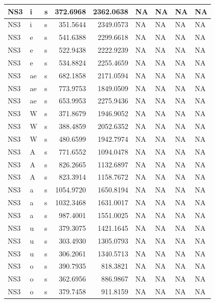 \documentclass[man, fleqn, noextraspace]{apa6}
\begin{document}
\begin{tabular}{l|l|l|r|r|l|l|l|l}
\hline
NS3 & i & s & 372.6968 & 2362.0638 & NA & NA & NA & NA\\
\hline
NS3 & i & s & 351.5644 & 2349.0573 & NA & NA & NA & NA\\
\hline
NS3 & e & s & 541.6388 & 2299.6618 & NA & NA & NA & NA\\
\hline
NS3 & e & s & 522.9438 & 2222.9239 & NA & NA & NA & NA\\
\hline
NS3 & e & s & 534.8824 & 2255.4659 & NA & NA & NA & NA\\
\hline
NS3 & ae & s & 682.1858 & 2171.0594 & NA & NA & NA & NA\\
\hline
NS3 & ae & s & 773.9753 & 1849.0509 & NA & NA & NA & NA\\
\hline
NS3 & ae & s & 653.9953 & 2275.9436 & NA & NA & NA & NA\\
\hline
NS3 & W & s & 371.8679 & 1946.9052 & NA & NA & NA & NA\\
\hline
NS3 & W & s & 388.4859 & 2052.6352 & NA & NA & NA & NA\\
\hline
NS3 & W & s & 480.6599 & 1942.7974 & NA & NA & NA & NA\\
\hline
NS3 & A & s & 771.6552 & 1094.0478 & NA & NA & NA & NA\\
\hline
NS3 & A & s & 826.2665 & 1132.6897 & NA & NA & NA & NA\\
\hline
NS3 & A & s & 823.3914 & 1158.7672 & NA & NA & NA & NA\\
\hline
NS3 & a & s & 1054.9720 & 1650.8194 & NA & NA & NA & NA\\
\hline
NS3 & a & s & 1032.3468 & 1631.0017 & NA & NA & NA & NA\\
\hline
NS3 & a & s & 987.4001 & 1551.0025 & NA & NA & NA & NA\\
\hline
NS3 & u & s & 379.3075 & 1421.1645 & NA & NA & NA & NA\\
\hline
NS3 & u & s & 303.4930 & 1305.0793 & NA & NA & NA & NA\\
\hline
NS3 & u & s & 306.2061 & 1340.5713 & NA & NA & NA & NA\\
\hline
NS3 & o & s & 390.7935 & 818.3821 & NA & NA & NA & NA\\
\hline
NS3 & o & s & 362.6956 & 886.9867 & NA & NA & NA & NA\\
\hline
NS3 & o & s & 379.7458 & 911.8159 & NA & NA & NA & NA\\
\hline
\end{tabular}
\end{document}
